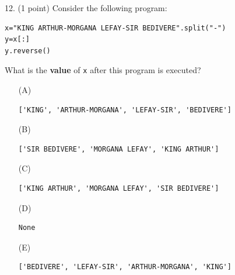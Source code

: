 \documentclass{article}
\begin{document}
\noindent
\begin{minipage}{\textwidth}
12. (1 point)
Consider the following program:
\begin{verbatim}
x="KING ARTHUR-MORGANA LEFAY-SIR BEDIVERE".split("-")
y=x[:]
y.reverse()
\end{verbatim}
What is the \textbf{value} of \texttt{x} after this program is executed?

\begin{enumerate}
\item[(A)]
\begin{verbatim}['KING', 'ARTHUR-MORGANA', 'LEFAY-SIR', 'BEDIVERE']\end{verbatim}

\item[(B)]
\begin{verbatim}['SIR BEDIVERE', 'MORGANA LEFAY', 'KING ARTHUR']\end{verbatim}

\item[(C)]
\begin{verbatim}['KING ARTHUR', 'MORGANA LEFAY', 'SIR BEDIVERE']\end{verbatim}

\item[(D)]
\begin{verbatim}None\end{verbatim}

\item[(E)]
\begin{verbatim}['BEDIVERE', 'LEFAY-SIR', 'ARTHUR-MORGANA', 'KING']\end{verbatim}

\end{enumerate}
\end{minipage}
\vspace{2em}
\filbreak\vfil{}\vfilneg
\end{document}
